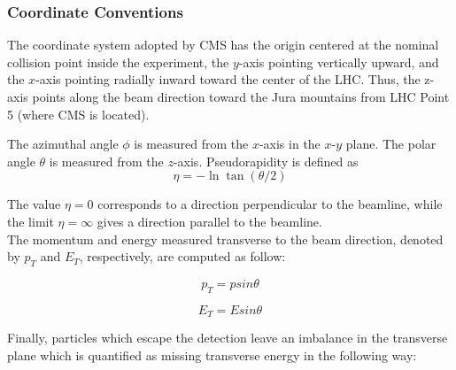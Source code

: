 
\subsubsection{Coordinate Conventions}
The coordinate system adopted by CMS has the origin centered at the nominal collision point inside the experiment,  the $y$-axis pointing vertically upward, and the $x$-axis pointing radially inward toward the center of the LHC. Thus, the z-axis points along the beam direction toward the Jura mountains from LHC Point 5 (where CMS is located). 

The azimuthal angle $\phi$ is measured from the $x$-axis in the $x$-$y$ plane. The polar angle $\theta$ is measured from the $z$-axis. Pseudorapidity is defined as 
\begin{equation}
\eta = -\ln \tan (\theta / 2)
\end{equation}

The value $\eta=0$ corresponds to a direction perpendicular to the beamline, while the limit $\eta = \infty$ gives a direction parallel to the beamline. \\
The momentum and energy measured transverse to the beam direction, denoted by $p_T$ and $E_T$, respectively, are computed  as follow:

\begin{equation}
p_T = p sin \theta
\end{equation}

\begin{equation}
E_T = E sin \theta
\end{equation}

Finally, particles which escape the detection leave an imbalance in the transverse plane which is quantified as missing transverse energy in the following way:

